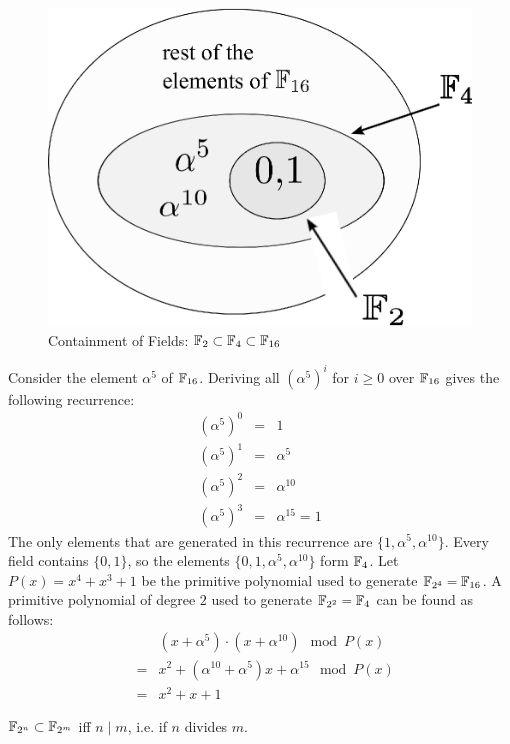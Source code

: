 \begin{figure}[H]
\begin{center}
\includegraphics[scale=0.7]{./figures/field-cont}
\end{center}
\caption{Containment of Fields: ${\mathbb{F}}_2 \subset {\mathbb{F}}_4 \subset {\mathbb{F}}_{16}$}
\label{fig:contain2_4_16}
\end{figure}

Consider the element $\alpha^5$ of ${\mathbb{F}}_{16}$. 
Deriving all $(\alpha^5)^i$ for $i \geq 0$ 
over ${\mathbb{F}}_{16}$ gives the following recurrence:
\begin{eqnarray}
(\alpha^5)^0&=&1\nonumber \\
(\alpha^5)^1 &=& \alpha^5\nonumber \\
(\alpha^5)^2 &=& \alpha^{10}\nonumber \\
(\alpha^5)^3 &=& \alpha^{15} = 1
\end{eqnarray}
The only elements that are generated in this recurrence are $\{1,\alpha^5,\alpha^{10}\}$.
Every field contains $\{0,1\}$, so the elements $\{0,1,\alpha^5,\alpha^{10}\}$ form ${\mathbb{F}}_4$.
Let $P(x)=x^4+x^3+1$ be the primitive polynomial used to generate
${\mathbb{F}}_{2^4}={\mathbb{F}}_{16}$. A primitive polynomial of degree $2$ used to generate ${\mathbb{F}}_{2^2}={\mathbb{F}}_4$
can be found as follows:
\begin{eqnarray}
& &(x+\alpha^5)\cdot(x+\alpha^{10}) \mod P(x) \nonumber \\
&=& x^2+(\alpha^{10}+\alpha^5)x+\alpha^{15} \mod P(x) \nonumber \\
&=& x^2+x+1
\end{eqnarray}

\begin{Theorem}
${\mathbb{F}}_{2^n}\subset{\mathbb{F}}_{2^m}$ iff $n \mid m$, i.e. if $n$ divides $m$.
\end{Theorem}

